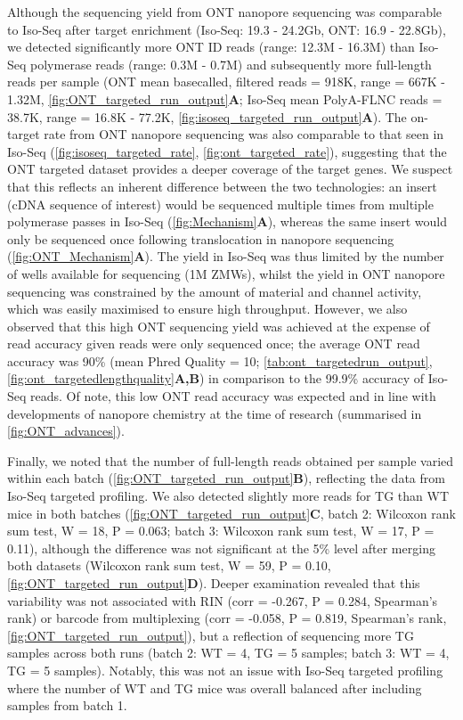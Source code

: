 \newpage
Although the sequencing yield from ONT nanopore sequencing was comparable to Iso-Seq after target enrichment (Iso-Seq: 19.3 - 24.2Gb, ONT: 16.9 - 22.8Gb), we detected significantly more ONT ID reads (range: 12.3M - 16.3M) than Iso-Seq polymerase reads (range: 0.3M - 0.7M) and subsequently more full-length reads per sample (ONT mean basecalled, filtered reads = 918K, range = 667K - 1.32M, \cref{fig:ONT_targeted_run_output}\textbf{A}; Iso-Seq mean PolyA-FLNC reads = 38.7K, range = 16.8K - 77.2K, \cref{fig:isoseq_targeted_run_output}\textbf{A}). The on-target rate from ONT nanopore sequencing was also comparable to that seen in Iso-Seq (\cref{fig:isoseq_targeted_rate}, \cref{fig:ont_targeted_rate}), suggesting that the ONT targeted dataset provides a deeper coverage of the target genes. We suspect that this reflects an inherent difference between the two technologies: an insert (cDNA sequence of interest) would be sequenced multiple times from multiple polymerase passes in Iso-Seq (\cref{fig:Mechanism}\textbf{A}), whereas the same insert would only be sequenced once following translocation in nanopore sequencing (\cref{fig:ONT_Mechanism}\textbf{A}). The yield in Iso-Seq was thus limited by the number of wells available for sequencing (1M ZMWs), whilst the yield in ONT nanopore sequencing was constrained by the amount of material and channel activity, which was easily maximised to ensure high throughput. However, we also observed that this high ONT sequencing yield was achieved at the expense of read accuracy given reads were only sequenced once; the average ONT read accuracy was 90\% (mean Phred Quality = 10; \cref{tab:ont_targetedrun_output}, \cref{fig:ont_targetedlengthquality}\textbf{A,B}) in comparison to the 99.9\% accuracy of Iso-Seq reads. Of note, this low ONT read accuracy was expected and in line with developments of nanopore chemistry at the time of research (summarised in \cref{fig:ONT_advances}).  

Finally, we noted that the number of full-length reads obtained per sample varied within each batch (\cref{fig:ONT_targeted_run_output}\textbf{B}), reflecting the data from Iso-Seq targeted profiling. We also detected slightly more reads for TG than WT mice in both batches (\cref{fig:ONT_targeted_run_output}\textbf{C}, batch 2: Wilcoxon rank sum test, W = 18, P = 0.063; batch 3: Wilcoxon rank sum test, W = 17, P = 0.11), although the difference was not significant at the 5\% level after merging both datasets (Wilcoxon rank sum test, W = 59, P = 0.10, \cref{fig:ONT_targeted_run_output}\textbf{D}). Deeper examination revealed that this variability was not associated with RIN (corr = -0.267, P = 0.284, Spearman's rank) or barcode from multiplexing (corr = -0.058, P = 0.819, Spearman's rank, \cref{fig:ONT_targeted_run_output}), but a reflection of sequencing more TG samples across both runs (batch 2: WT = 4, TG = 5 samples; batch 3: WT = 4, TG = 5 samples). Notably, this was not an issue with Iso-Seq targeted profiling where the number of WT and TG mice was overall balanced after including samples from batch 1. %

